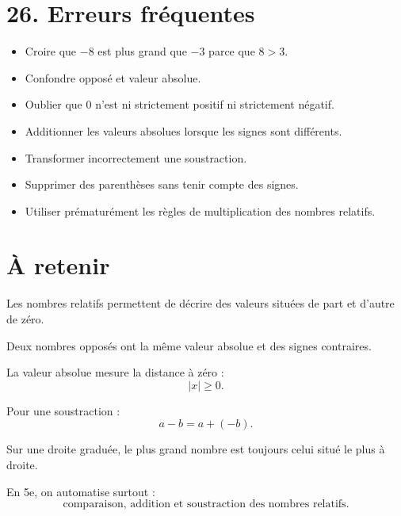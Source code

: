 \section{26. Erreurs fréquentes}

\begin{itemize}
\item Croire que $-8$ est plus grand que $-3$ parce que $8>3$.
\item Confondre opposé et valeur absolue.
\item Oublier que $0$ n'est ni strictement positif ni strictement négatif.
\item Additionner les valeurs absolues lorsque les signes sont différents.
\item Transformer incorrectement une soustraction.
\item Supprimer des parenthèses sans tenir compte des signes.
\item Utiliser prématurément les règles de multiplication des nombres relatifs.
\end{itemize}

\section{À retenir}

\begin{aretenir}
Les nombres relatifs permettent de décrire des valeurs situées de part et d'autre de zéro.

Deux nombres opposés ont la même valeur absolue et des signes contraires.

La valeur absolue mesure la distance à zéro :
\[
\boxed{|x|\ge0}.
\]

Pour une soustraction :
\[
\boxed{a-b=a+(-b)}.
\]

Sur une droite graduée, le plus grand nombre est toujours celui situé le plus à droite.

En 5e, on automatise surtout :
\[
\boxed{\text{comparaison, addition et soustraction des nombres relatifs}}.
\]
\end{aretenir}

